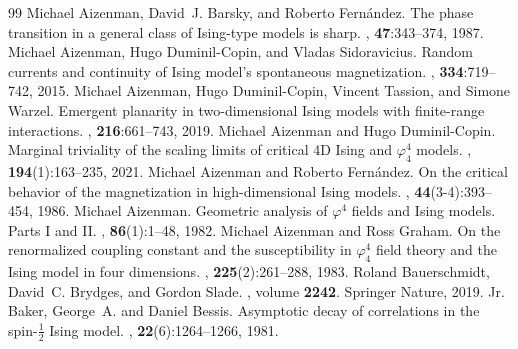 \documentclass[10pt,a4paper]{amsart}
\numberwithin{equation}{section}
\begin{document}
\begin{thebibliography}{99}
 Michael Aizenman, David~J. Barsky, and Roberto Fern{\'a}ndez. \newblock The phase transition in a general class of {I}sing-type models is sharp. , \textbf{47}:343--374, 1987.
 Michael Aizenman, Hugo Duminil-Copin, and Vladas Sidoravicius. \newblock Random currents and continuity of {I}sing model’s spontaneous magnetization. , \textbf{334}:719--742, 2015.
 Michael Aizenman, Hugo Duminil-Copin, Vincent Tassion, and Simone Warzel. \newblock Emergent planarity in two-dimensional {I}sing models with finite-range interactions. , \textbf{216}:661--743, 2019.
 Michael Aizenman and Hugo Duminil-Copin. \newblock Marginal triviality of the scaling limits of critical 4{D} {I}sing and $\varphi^4_4$ models. , \textbf{194}(1):163--235, 2021.
 Michael Aizenman and Roberto Fern{\'a}ndez. \newblock On the critical behavior of the magnetization in high-dimensional {I}sing models. , \textbf{44}(3-4):393--454, 1986.
 Michael Aizenman. \newblock Geometric analysis of $\varphi^4$ fields and {I}sing models. {P}arts {I} and {II}. , \textbf{86}(1):1--48, 1982.
 Michael Aizenman and Ross Graham. \newblock On the renormalized coupling constant and the susceptibility in $\varphi^4_4$ field theory and the {I}sing model in four dimensions. , \textbf{225}(2):261--288, 1983.
 Roland Bauerschmidt, David~C. Brydges, and Gordon Slade. , volume \textup{\textbf{2242}}. \newblock Springer Nature, 2019.
 Jr. Baker, George~A. and Daniel Bessis. \newblock Asymptotic decay of correlations in the spin-$\frac12$ {I}sing model. , \textbf{22}(6):1264--1266, 1981.

\end{thebibliography}
\end{document}
